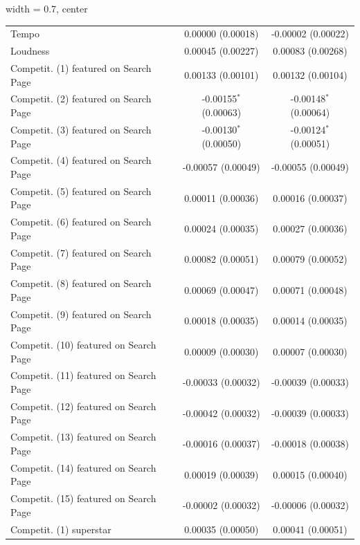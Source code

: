 \begin{table}[htbp]
\begin{adjustbox}{width = 0.7\textwidth, center}
\begin{threeparttable}[b]
\begin{tabular}{lcc}
            Tempo                                  & 0.00000 (0.00018)         & -0.00002 (0.00022)\\   
            Loudness                               & 0.00045 (0.00227)         & 0.00083 (0.00268)\\   
            Competit. (1) featured on Search Page  & 0.00133 (0.00101)         & 0.00132 (0.00104)\\   
            Competit. (2) featured on Search Page  & -0.00155$^{*}$ (0.00063)  & -0.00148$^{*}$ (0.00064)\\   
            Competit. (3) featured on Search Page  & -0.00130$^{*}$ (0.00050)  & -0.00124$^{*}$ (0.00051)\\   
            Competit. (4) featured on Search Page  & -0.00057 (0.00049)        & -0.00055 (0.00049)\\   
            Competit. (5) featured on Search Page  & 0.00011 (0.00036)         & 0.00016 (0.00037)\\   
            Competit. (6) featured on Search Page  & 0.00024 (0.00035)         & 0.00027 (0.00036)\\   
            Competit. (7) featured on Search Page  & 0.00082 (0.00051)         & 0.00079 (0.00052)\\   
            Competit. (8) featured on Search Page  & 0.00069 (0.00047)         & 0.00071 (0.00048)\\   
            Competit. (9) featured on Search Page  & 0.00018 (0.00035)         & 0.00014 (0.00035)\\   
            Competit. (10) featured on Search Page & 0.00009 (0.00030)         & 0.00007 (0.00030)\\   
            Competit. (11) featured on Search Page & -0.00033 (0.00032)        & -0.00039 (0.00033)\\   
            Competit. (12) featured on Search Page & -0.00042 (0.00032)        & -0.00039 (0.00033)\\   
            Competit. (13) featured on Search Page & -0.00016 (0.00037)        & -0.00018 (0.00038)\\   
            Competit. (14) featured on Search Page & 0.00019 (0.00039)         & 0.00015 (0.00040)\\   
            Competit. (15) featured on Search Page & -0.00002 (0.00032)        & -0.00006 (0.00032)\\   
            Competit. (1) superstar                & 0.00035 (0.00050)         & 0.00041 (0.00051)\\   

\end{tabular}
\end{threeparttable}
\end{adjustbox}
\end{table}
